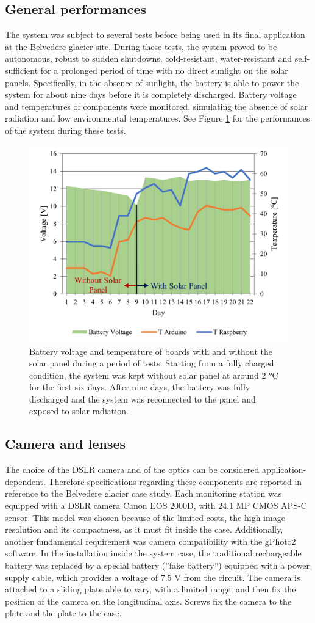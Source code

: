 \subsection{General performances}\label{General_performances}
The system was subject to several tests before being used in its final application at the
Belvedere glacier site. During these tests, the system proved to be autonomous, robust to
sudden shutdowns, cold-resistant, water-resistant and self-sufficient for a prolonged
period of time with no direct sunlight on the solar panels. Specifically, in the absence
of sunlight, the battery is able to power the system for about nine days before it is
completely discharged. Battery voltage and temperatures of components were monitored,
simulating the absence of solar radiation and low environmental temperatures. See Figure
\ref{fig:nominal} for the performances of the system during these tests.
\begin{figure}[h!]
  \centering
  \includegraphics[width=.5\textwidth]{nominal.png}
  \caption{Battery voltage and temperature of boards with and without the solar panel
    during a period of tests. Starting from a fully charged condition, the system was
    kept
    without solar panel at around 2 °C for the first six days. After nine days, the
    battery
    was fully discharged and the system was reconnected to the panel and exposed to solar
    radiation.}
  \label{fig:nominal}
\end{figure}

\subsection{Camera and lenses}\label{camera_lenses}
The choice of the DSLR camera and of the optics can be considered application-dependent.
Therefore specifications regarding these components are reported in reference to the
Belvedere glacier case study. Each monitoring station was equipped with a DSLR camera
Canon EOS 2000D, with 24.1 MP CMOS \mbox{APS-C} sensor. This model was chosen because of
the limited costs, the high image resolution and its compactness, as it must fit inside
the case. Additionally, another fundamental requirement was camera compatibility with the
gPhoto2 software. In the installation inside the system case, the traditional
rechargeable battery was replaced by a special battery (”fake battery”) equipped with a
power supply cable, which provides a voltage of 7.5 V from the circuit. The camera is
attached to a sliding plate able to vary, with a limited range, and then fix the position
of the camera on the longitudinal axis. Screws fix the camera to the plate and the plate
to the case.

